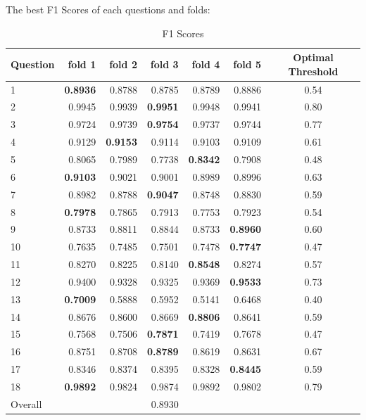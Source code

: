 \documentclass[11pt,a4paper]{article}
\begin{document}
    \newpage
    The best F1 Scores of each questions and folds:
    \begin{table}[H]
        \centering
        \begin{tabular}{l|rrrrr|c}
            Question & fold 1 & fold 2 & fold 3 & fold 4 & fold 5 & Optimal Threshold\\
            \hline \hline
            1 & \textbf{0.8936} & 0.8788 & 0.8785 & 0.8789 & 0.8886 & 0.54 \\
            2 & 0.9945 & 0.9939 & \textbf{0.9951} & 0.9948 & 0.9941 & 0.80 \\
            3 & 0.9724 & 0.9739 & \textbf{0.9754} & 0.9737 & 0.9744 & 0.77 \\
            4 & 0.9129 & \textbf{0.9153} & 0.9114 & 0.9103 & 0.9109 & 0.61 \\
            5 & 0.8065 & 0.7989 & 0.7738 & \textbf{0.8342} & 0.7908 & 0.48  \\
            6 & \textbf{0.9103} & 0.9021 & 0.9001 & 0.8989 & 0.8996 & 0.63 \\
            7 & 0.8982 & 0.8788 & \textbf{0.9047} & 0.8748 & 0.8830 & 0.59 \\
            8 & \textbf{0.7978} & 0.7865 & 0.7913 & 0.7753 & 0.7923 & 0.54 \\
            9 & 0.8733 & 0.8811 & 0.8844 & 0.8733 & \textbf{0.8960} & 0.60 \\
            10 & 0.7635 & 0.7485 & 0.7501 & 0.7478 & \textbf{0.7747} & 0.47 \\
            11 & 0.8270 & 0.8225 & 0.8140 & \textbf{0.8548} & 0.8274 & 0.57 \\
            12 & 0.9400 & 0.9328 & 0.9325 & 0.9369 & \textbf{0.9533} & 0.73 \\
            13 & \textbf{0.7009} & 0.5888 & 0.5952 & 0.5141 & 0.6468 & 0.40 \\
            14 & 0.8676 & 0.8600 & 0.8669 & \textbf{0.8806} & 0.8641 & 0.59 \\
            15 & 0.7568 & 0.7506 & \textbf{0.7871} & 0.7419 & 0.7678 & 0.47 \\
            16 & 0.8751 & 0.8708 & \textbf{0.8789} & 0.8619 & 0.8631 & 0.67 \\
            17 & 0.8346 & 0.8374 & 0.8395 & 0.8328 & \textbf{0.8445} & 0.59 \\
            18 & \textbf{0.9892} & 0.9824 & 0.9874 & 0.9892 & 0.9802 & 0.79 \\
            \hline
            Overall & & & 0.8930 & 
        \end{tabular}
        \caption{F1 Scores}
        \label{tab:f1_scores}
    \end{table}
\end{document}
